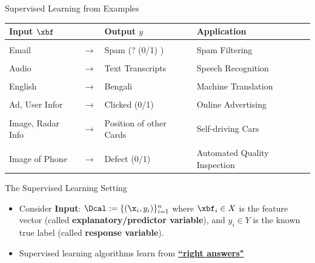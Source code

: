 \documentclass[aspectratio=169,xcolor=dvipsnames,svgnames,x11names,fleqn]{beamer}
\begin{document}
\begin{frame}{Supervised Learning from Examples}
\small
    \begin{tabular}{p{} p{} p{}p{}}
        \textbf{Input $\xbf$} & &  \textbf{Output $y$} & \textbf{Application}\\
        \hline \\ 
        Email & $\to$ & Spam (? (0/1) ) & Spam Filtering\\ \\
        Audio & $\to$ & Text Transcripts & Speech Recognition\\ \\
        English & $\to$ & Bengali & Machine Translation\\ \\
        Ad, User Infor & $\to$ & Clicked (0/1) & Online Advertising \\ \\
        Image, Radar Info & $\to$ & Position of other Cards & Self-driving Cars \\ \\
        Image of Phone & $\to$ & Defect (0/1) & Automated Quality Inspection
        \end{tabular}
    
\end{frame}



\begin{frame}{The Supervised Learning Setting}

 \begin{itemize}
        \item Consider {\bf\color{MediumBlue}Input}: $\Dcal:=\{(\x_i, y_i)\}_{i=1}^n$ where $\xbf_i \in X$ is the feature vector (called \textbf{explanatory/predictor variable}), and $y_i \in Y$ is the known true label (called \textbf{response variable}). 
        \item Supervised learning algorithms learn from \underline{\textbf{``right answers"}}
    \end{itemize}

\end{frame}
\end{document}

